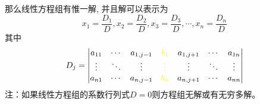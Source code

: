  那么线性方程组有惟一解, 并且解可以表示为
$$
{{x}_{1}}=\frac{{{D}_{1}}}{D},
{{x}_{2}}=\frac{{{D}_{2}}}{D},
{{x}_{3}}=\frac{{{D}_{3}}}{D},\cdots,
{{x}_{n}}=\frac{{{D}_{n}}}{D}
$$
其中
$$
{{D}_{j}}=\left| \begin{matrix}
    {{a}_{11}} & \cdots  & {{a}_{1,j-1}} & {\color{yellow}{{b}_{1}}} & {{a}_{1,j+1}} & \cdots  & {{a}_{1n}}  \\
    \vdots  & {\ddots} & \vdots          & {\color{yellow}\vdots}  & \vdots  & {\ddots} & \vdots   \\
    {{a}_{n1}} & \cdots  & {{a}_{n,j-1}} & {\color{yellow}{{b}_{n}}} & {{a}_{n,j+1}} & \cdots  & {{a}_{nn}}  \\
 \end{matrix} \right| 
$$
{\color{red}注：}如果线性方程组的系数行列式$D=0$则方程组无解或有无穷多解。



